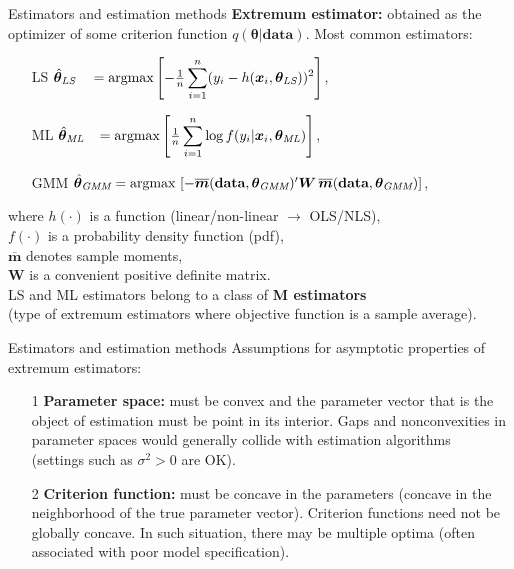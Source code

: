 \documentclass{beamer}
\begin{document}
\begin{frame}{Estimators and estimation methods}
\textbf{Extremum estimator:} obtained as the optimizer of some criterion function $q(\bm{\theta}|\textbf{data})$. Most common estimators:
\medskip
\begin{itemize}
    \item[LS] $\hat{\bm{\theta}}_{\textit{LS}}~~~=\textnormal{argmax}\left[ -\frac{1}{n} \displaystyle\sum_{i=1}^n (y_i - h(\bm{x}_i,\bm{\theta}_{\textit{LS}}))^2\right]$,
    \item[ML] $\hat{\bm{\theta}}_{\textit{ML}}~~\,=\textnormal{argmax}\left[ \frac{1}{n} \displaystyle\sum_{i=1}^n \log f(y_i|\bm{x}_i,\bm{\theta}_{\textit{ML}})\right]$,
    \item[GMM] $\hat{\bm{\theta}}_{\textit{GMM}}=\textnormal{argmax}\,\left[ -\overline{\bm{m}}(\textbf{data},\bm{\theta}_{\textit{GMM}})^{\prime}\bm{W} \, \overline{\bm{m}} (\textbf{data},\bm{\theta}_{\textit{GMM}})\right]$,
\end{itemize}
\medskip
where $h(\cdot)$ is a function (linear/non-linear $\rightarrow$ OLS/NLS),\\ $f(\cdot)$ is a probability density function (pdf),\\$\overline{\bm{m}}$ denotes sample moments, \\$\bm{W}$ is a convenient positive definite matrix.\\
\medskip
LS and ML estimators belong to a class of \textbf{M estimators} \\ \footnotesize (type of extremum estimators where objective function is a sample average).
\end{frame}
\begin{frame}{Estimators and estimation methods}
Assumptions for asymptotic properties of extremum estimators:
\medskip
\begin{itemize}
    \item[1] \textbf{Parameter space:} must be convex and the parameter vector that is the object of estimation must be point in its interior. Gaps and nonconvexities in parameter spaces would generally collide with estimation algorithms \\(settings such as $\sigma^2 > 0$ are OK).
    \medskip
    \item[2] \textbf{Criterion function:} must be concave in the parameters (concave in the neighborhood of the true parameter vector). Criterion functions need not be globally concave. In such situation, there may be multiple optima (often associated with poor model specification).
\end{itemize}
\end{frame}
\end{document}
